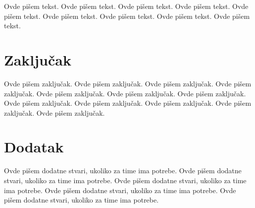 \documentclass[a4paper]{article}
\begin{document}
Ovde pišem tekst. 
Ovde pišem tekst. 
Ovde pišem tekst. 
Ovde pišem tekst. 
Ovde pišem tekst. 
Ovde pišem tekst. 
Ovde pišem tekst. 
Ovde pišem tekst. 
Ovde pišem tekst. 

\section{Zaključak}
\label{sec:zakljucak}

Ovde pišem zaključak. 
Ovde pišem zaključak. 
Ovde pišem zaključak. 
Ovde pišem zaključak. 
Ovde pišem zaključak. 
Ovde pišem zaključak. 
Ovde pišem zaključak. 
Ovde pišem zaključak. 
Ovde pišem zaključak. 
Ovde pišem zaključak. 
Ovde pišem zaključak. 
Ovde pišem zaključak. 


\appendix
 


\appendix
\section{Dodatak}
Ovde pišem dodatne stvari, ukoliko za time ima potrebe.
Ovde pišem dodatne stvari, ukoliko za time ima potrebe.
Ovde pišem dodatne stvari, ukoliko za time ima potrebe.
Ovde pišem dodatne stvari, ukoliko za time ima potrebe.
Ovde pišem dodatne stvari, ukoliko za time ima potrebe.
\end{document}
